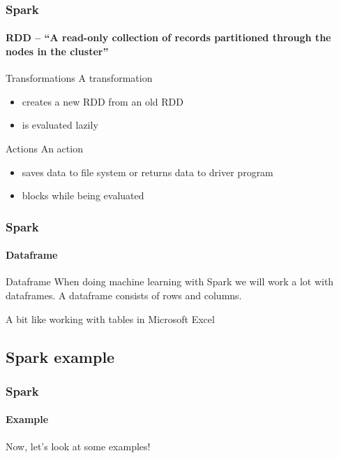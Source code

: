 \documentclass[aspectratio=169,dvipsnames]{beamer}
\begin{document}
        \begin{frame}
            \frametitle{Spark}
            \framesubtitle{RDD -- ``A read-only collection of records partitioned through the nodes in the cluster''}
            \begin{block}{Transformations}
                A transformation 
                \begin{itemize}
                    \item creates a \alert{new RDD} from an old RDD
                    \item is evaluated \alert{lazily}
                \end{itemize}
            \end{block}
            \begin{block}{Actions}
                An action 
                \begin{itemize}
                    \item \alert{saves data} to file system or \alert{returns data} to driver program
                    \item \alert{blocks} while being evaluated
                \end{itemize}
            \end{block}
        \end{frame}

        \begin{frame}
            \frametitle{Spark}
            \framesubtitle{Dataframe}
            \begin{block}{Dataframe}
                When doing machine learning with Spark we will work a lot with
                dataframes. A dataframe consists of rows and columns.

                A bit like working with tables in Microsoft Excel \smiley{} 
            \end{block}
        \end{frame}

\subsection{Spark example}
        \begin{frame}
            \frametitle{Spark}
            \framesubtitle{Example}
            \begin{center}
                Now, let's look at some examples!
            \end{center}
        \end{frame}
\end{document}
